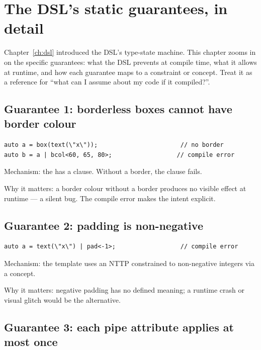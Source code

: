 \chapter{The DSL's static guarantees, in detail}
\label{ch:dsl-guarantees}

\begin{aside}
Chapter~\ref{ch:dsl} introduced the DSL's type-state machine.
This chapter zooms in on the specific guarantees: what the DSL
prevents at compile time, what it allows at runtime, and how
each guarantee maps to a constraint or concept. Treat it as a
reference for ``what can I assume about my code if it
compiled?''.
\end{aside}

\section{Guarantee 1: borderless boxes cannot have border colour}

\begin{lstlisting}
auto a = box(text(\"x\"));                       // no border
auto b = a | bcol<60, 65, 80>;                  // compile error
\end{lstlisting}

Mechanism: the  has a
 clause. Without a border, the
clause fails.

Why it matters: a border colour without a border produces no
visible effect at runtime --- a silent bug. The compile error
makes the intent explicit.

\section{Guarantee 2: padding is non-negative}

\begin{lstlisting}
auto a = text(\"x\") | pad<-1>;                  // compile error
\end{lstlisting}

Mechanism: the  template uses an NTTP constrained to
non-negative integers via a concept.

Why it matters: negative padding has no defined meaning; a
runtime crash or visual glitch would be the alternative.

\section{Guarantee 3: each pipe attribute applies at most once}

